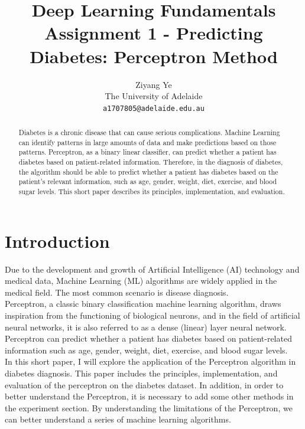 \documentclass[10pt,twocolumn,letterpaper]{article}
\begin{document}
\title{Deep Learning Fundamentals\\
	Assignment 1 - Predicting Diabetes: Perceptron Method}

\author{Ziyang Ye\\
The University of Adelaide\\
{\tt\small a1707805@adelaide.edu.au}}
\maketitle

\begin{abstract}
	Diabetes is a chronic disease that can cause serious complications. Machine Learning can identify patterns in large amounts of data and make predictions based on those patterns.
	Perceptron, as a binary linear classifier, can predict whether a patient has diabetes based on patient-related information.
	Therefore, in the diagnosis of diabetes, the algorithm should be able to predict whether a patient has diabetes based on the patient's relevant information, such as age, gender, weight, diet, exercise, and blood sugar levels.
	This short paper describes its principles, implementation, and evaluation.
\end{abstract}

\section{Introduction}
\label{sec:intro}

Due to the development and growth of Artificial Intelligence (AI) technology and medical data, Machine Learning (ML) algorithms are widely applied in the medical field.
The most common scenario is disease diagnosis. \\
\indent Perceptron, a classic binary classification machine learning algorithm, draws inspiration from the functioning of biological neurons, and in the field of artificial neural networks, it is also referred to as a dense (linear) layer neural network.
Perceptron can predict whether a patient has diabetes based on patient-related information such as age, gender, weight, diet, exercise, and blood sugar levels. \\
\indent In this short paper, I will explore the application of the Perceptron algorithm in diabetes diagnosis.
This paper includes the principles, implementation, and evaluation of the perceptron on the diabetes dataset.
In addition, in order to better understand the Perceptron, it is necessary to add some other methods in the experiment section.
By understanding the limitations of the Perceptron, we can better understand a series of machine learning algorithms.
\end{document}
